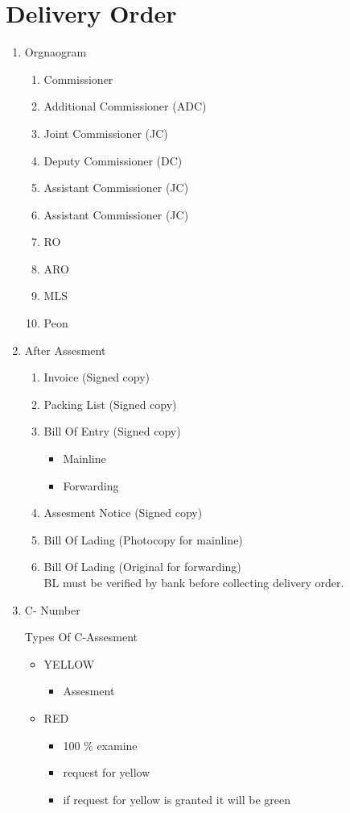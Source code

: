 \documentclass[10pt]{article}
\begin{document}
\section{Delivery Order}\label{DO}
\begin{enumerate}
    \item Orgnaogram
\begin{enumerate}
        \item Commissioner
        \item Additional Commissioner (ADC)
        \item Joint Commissioner (JC)
        \item Deputy Commissioner (DC)
        \item Assistant Commissioner (JC)
        \item Assistant Commissioner (JC)
        \item RO
        \item ARO
        \item MLS
        \item Peon
\end{enumerate}
    \item After Assesment
\begin{enumerate}
    \item Invoice (Signed copy)
    \item Packing List (Signed copy)
    \item Bill Of Entry (Signed copy)
\begin{itemize}
    \item Mainline
    \item Forwarding
\end{itemize}
    \item Assesment Notice (Signed copy)
    \item Bill Of Lading (Photocopy for mainline)
    \item Bill Of Lading (Original for forwarding)
        \\
        BL must be verified by bank
        before collecting delivery order.
\end{enumerate}
    \item C- Number
\begin{description}
    \item [Types Of C-Assesment]
\end{description}
\begin{itemize}
        \item YELLOW
\begin{itemize}
            \item Assesment
\end{itemize}
        \item RED
\begin{itemize}
            \item 100 \% examine
            \item request for yellow
            \item if request for yellow
                is granted it will be green
\end{itemize}
\end{itemize}

\end{enumerate}
\end{document}

